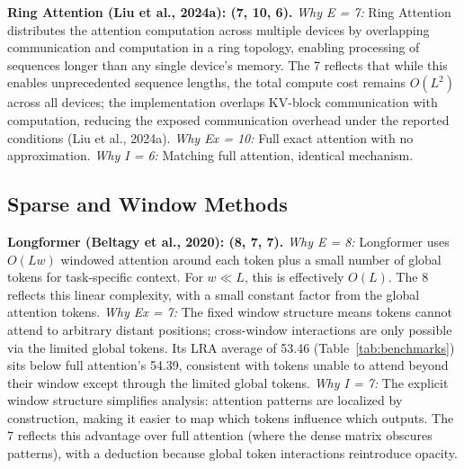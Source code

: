 \documentclass[10pt,twocolumn]{article}
\begin{document}
\textbf{Ring Attention (Liu et al., 2024a): (7, 10, 6).}
\textit{Why E = 7:} Ring Attention distributes the attention computation across multiple devices by overlapping communication and computation in a ring topology, enabling processing of sequences longer than any single device's memory. The 7 reflects that while this enables unprecedented sequence lengths, the total compute cost remains $O(L^2)$ across all devices; the implementation overlaps KV-block communication with computation, reducing the exposed communication overhead under the reported conditions (Liu et al., 2024a). \textit{Why Ex = 10:} Full exact attention with no approximation. \textit{Why I = 6:} Matching full attention, identical mechanism.

\subsection*{Sparse and Window Methods}

\textbf{Longformer (Beltagy et al., 2020): (8, 7, 7).}
\textit{Why E = 8:} Longformer uses $O(Lw)$ windowed attention around each token plus a small number of global tokens for task-specific context. For $w \ll L$, this is effectively $O(L)$. The 8 reflects this linear complexity, with a small constant factor from the global attention tokens. \textit{Why Ex = 7:} The fixed window structure means tokens cannot attend to arbitrary distant positions; cross-window interactions are only possible via the limited global tokens. Its LRA average of 53.46 (Table~\ref{tab:benchmarks}) sits below full attention's 54.39, consistent with tokens unable to attend beyond their window except through the limited global tokens. \textit{Why I = 7:} The explicit window structure simplifies analysis: attention patterns are localized by construction, making it easier to map which tokens influence which outputs. The 7 reflects this advantage over full attention (where the dense matrix obscures patterns), with a deduction because global token interactions reintroduce opacity.
\end{document}
